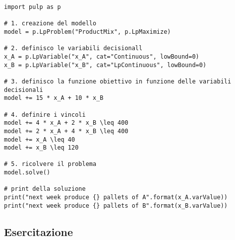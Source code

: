 \begin{lstlisting}
import pulp as p

# 1. creazione del modello
model = p.LpProblem("ProductMix", p.LpMaximize)

# 2. definisco le variabili decisionall
x_A = p.LpVariable("x_A", cat="Continuous", lowBound=0)
x_B = p.LpVariable("x_B", cat="LpContinuous", lowBound=0)

# 3. definisco la funzione obiettivo in funzione delle variabili decisionali
model += 15 * x_A + 10 * x_B

# 4. definire i vincoli
model += 4 * x_A + 2 * x_B \leq 400
model += 2 * x_A + 4 * x_B \leq 400
model += x_A \leq 40
model += x_B \leq 120

# 5. ricolvere il problema
model.solve()

# print della soluzione
print("next week produce {} pallets of A".format(x_A.varValue))
print("next week produce {} pallets of B".format(x_B.varValue))
\end{lstlisting}


\subsection{Esercitazione}

